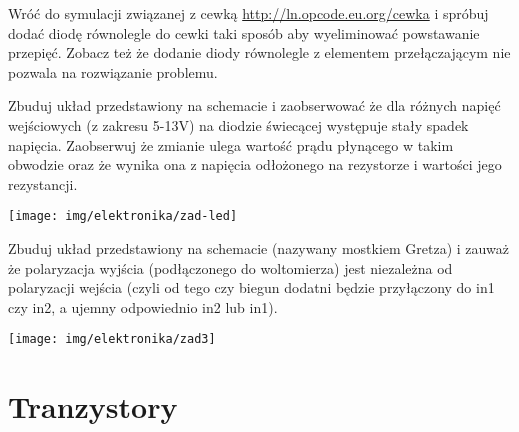 \documentclass{pdfBooklets}
\begin{document}
\begin{Zadanie}{}{}
Wróć do symulacji związanej z cewką \url{http://ln.opcode.eu.org/cewka} i spróbuj dodać diodę równolegle do cewki taki sposób aby wyeliminować powstawanie przepięć.
Zobacz też że dodanie diody równolegle z elementem przełączającym nie pozwala na rozwiązanie problemu.
\end{Zadanie}

\begin{Zadanie}{}{}
\noindent\begin{minipage}[b]{0.7\textwidth}
Zbuduj układ przedstawiony na schemacie i zaobserwować że dla różnych napięć wejściowych (z zakresu 5-13V) na diodzie świecącej występuje stały spadek napięcia.
Zaobserwuj że zmianie ulega wartość prądu płynącego w takim obwodzie oraz że wynika ona z napięcia odłożonego na rezystorze i wartości jego rezystancji.
\end{minipage}
\hfill
\begin{minipage}[b]{0.25\textwidth}
\texttt{[image: img/elektronika/zad-led]}\vspace{0.5cm}
\end{minipage}
\end{Zadanie}

\begin{Zadanie}{}{}
\noindent\begin{minipage}[b]{0.6\textwidth}
Zbuduj układ przedstawiony na schemacie (nazywany mostkiem Gretza) i zauważ że polaryzacja wyjścia (podłączonego do woltomierza) jest niezależna od polaryzacji wejścia (czyli od tego czy biegun dodatni będzie przyłączony do in1 czy in2, a ujemny odpowiednio in2 lub in1).
\end{minipage}
\hfill
\begin{minipage}[b]{0.35\textwidth}
\texttt{[image: img/elektronika/zad3]}
\end{minipage}
\end{Zadanie}

\section{Tranzystory}
\end{document}

